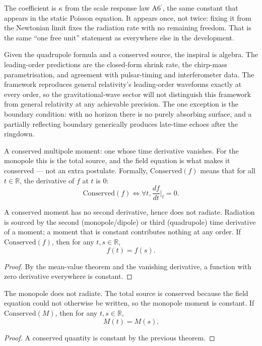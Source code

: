 The coefficient is $\kappa$ from the scale response law A6$^\prime$, the same constant that appears in the static Poisson equation. It appears once, not twice: fixing it from the Newtonian limit fixes the radiation rate with no remaining freedom. That is the same ``one free unit'' statement as everywhere else in the development.

Given the quadrupole formula and a conserved source, the inspiral is algebra. The leading-order predictions are the closed-form shrink rate, the chirp-mass parametrisation, and agreement with pulsar-timing and interferometer data. The framework reproduces general relativity's leading-order waveforms exactly at every order, so the gravitational-wave sector will not distinguish this framework from general relativity at any achievable precision. The one exception is the boundary condition: with no horizon there is no purely absorbing surface, and a partially reflecting boundary generically produces late-time echoes after the ringdown.

\begin{definition}
A conserved multipole moment: one whose time derivative vanishes. For the monopole this is the total source, and the field equation is what makes it conserved — not an extra postulate. Formally, $\text{Conserved}(f)$ means that for all $t \in \mathbb{R}$, the derivative of $f$ at $t$ is $0$:
\[
\text{Conserved}(f) \iff \forall t, \frac{df}{dt}\bigg|_t = 0.
\]
\end{definition}

\begin{theorem}
A conserved moment has no second derivative, hence does not radiate. Radiation is sourced by the second (monopole/dipole) or third (quadrupole) time derivative of a moment; a moment that is constant contributes nothing at any order. If $\text{Conserved}(f)$, then for any $t, s \in \mathbb{R}$,
\[
f(t) = f(s).
\]
\begin{proof}
By the mean-value theorem and the vanishing derivative, a function with zero derivative everywhere is constant.
\end{proof}
\end{theorem}

\begin{theorem}
The monopole does not radiate. The total source is conserved because the field equation could not otherwise be written, so the monopole moment is constant. If $\text{Conserved}(M)$, then for any $t, s \in \mathbb{R}$,
\[
M(t) = M(s).
\]
\begin{proof}
A conserved quantity is constant by the previous theorem.
\end{proof}
\end{theorem}

